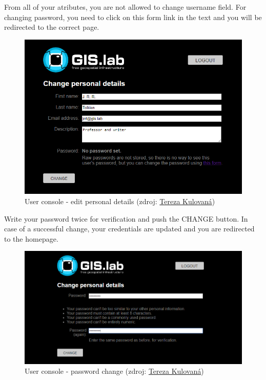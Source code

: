 From all of your atributes, you are not allowed to change \textsf{username} field. For changing password, you need to click on \textsf{this form} link in the text and you will be redirected to the correct page.
\begin{figure}[H] \centering
    \includegraphics[width=430pt]{./prilohy/guide-user-change.png}
    \caption[User console - edit personal details]{User console - edit personal details (zdroj:
	\href{}{Tereza Kulovaná})}
	\label{fig:guide-user-change}
\end{figure}

Write your password twice for verification and push the \textsf{CHANGE} button. In case of a successful change, your credentials are updated and you are redirected to the homepage.
\begin{figure}[H] \centering
    \includegraphics[width=430pt]{./prilohy/guide-user-password.png}
    \caption[User console - password change]{User console - password change (zdroj:
	\href{}{Tereza Kulovaná})}
	\label{fig:guide-user-password}
\end{figure}

